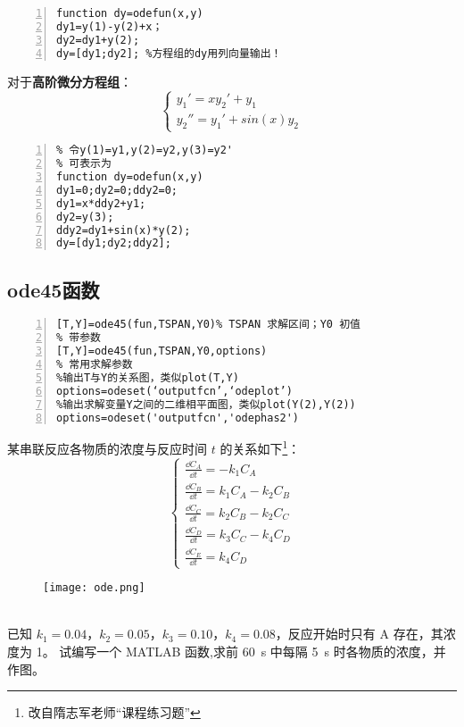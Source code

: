 \begin{lstlisting}[frame=single,numbers=left]
% 可表示为
function dy=odefun(x,y)
dy1=y(1)-y(2)+x；
dy2=dy1+y(2);
dy=[dy1;dy2]; %方程组的dy用列向量输出！
\end{lstlisting}

对于\textcolor{third}{\textbf{高阶微分方程组}}：
\[
\begin{cases}
y_1'=xy_2'+y_1\\
y_2''=y_1'+sin(x)y_2
\end{cases} \]

\begin{lstlisting}[frame=single,numbers=left]
% 变量代换
% 令y(1)=y1,y(2)=y2,y(3)=y2'
% 可表示为
function dy=odefun(x,y)
dy1=0;dy2=0;ddy2=0;
dy1=x*ddy2+y1;
dy2=y(3);
ddy2=dy1+sin(x)*y(2);
dy=[dy1;dy2;ddy2];
\end{lstlisting}

\subsection{ode45函数}
\begin{lstlisting}[frame=single,numbers=left]
% 常用形式
[T,Y]=ode45(fun,TSPAN,Y0)% TSPAN 求解区间；Y0 初值
% 带参数
[T,Y]=ode45(fun,TSPAN,Y0,options)
% 常用求解参数
%输出T与Y的关系图，类似plot(T,Y)
options=odeset(‘outputfcn’,‘odeplot’) 
%输出求解变量Y之间的二维相平面图，类似plot(Y(2),Y(2))
options=odeset('outputfcn','odephas2') 
\end{lstlisting}

\newpage
\begin{problem}
某串联反应各物质的浓度与反应时间 $t$ 的关系如下\footnote{改自隋志军老师“课程练习题”}：
\[
	\begin{cases}
		\frac{\dd{C_{A}}}{\dd{t}} = - k_{1} C_{A} \\
		\frac{\dd{C_{B}}}{\dd{t}} = k_{1} C_{A} - k_{2} C_{B} \\
		\frac{\dd{C_{C}}}{\dd{t}} = k_{2} C_{B} - k_{2} C_{C} \\
		\frac{\dd{C_{D}}}{\dd{t}} = k_{3} C_{C} - k_{4} C_{D} \\
		\frac{\dd{C_{E}}}{\dd{t}} = k_{4} C_{D}
	\end{cases}
\]
\begin{figure}[htbp]
\centering
\texttt{[image: ode.png]}
\end{figure}
\\已知 $k_{1} = 0.04$，$k_{2}=0.05$，$k_{3}=0.10$，$k_{4}=0.08$，反应开始时只有 A 存在，其浓度为 1。
试编写一个 MATLAB 函数,求前 \SI{60}{s} 中每隔 \SI{5}{s} 时各物质的浓度，并作图。
\end{problem}

